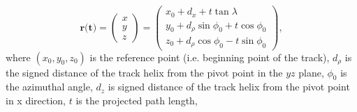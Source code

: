 \documentclass[a4paper,11pt]{article}
\def\art{{\it art}}
\begin{document}
\begin{equation}
\textbf{r(t)} = \begin{pmatrix} x \\ y \\ z \end{pmatrix} = \begin{pmatrix} x_0 + d_x + t\tan\lambda \  \\ y_0 + d_\rho\sin\phi_0 + t\cos\phi_0 \\ z_0 + d_\rho \cos\phi_0 - t \sin\phi_0 \end{pmatrix},
\end{equation}
where $(x_0, y_0, z_0)$ is the reference point (i.e. beginning point of the track), $d_\rho$ is the signed distance of the track helix from the pivot point in the $yz$ plane, $\phi_0$ is the azimuthal angle, $d_z$ is signed distance of the track helix from the pivot point in x direction, $t$ is the projected path length, 





\clearpage
\end{document}

